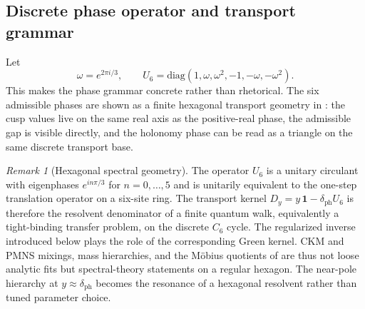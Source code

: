 \documentclass[11pt,a4paper]{article}
\theoremstyle{definition}
\theoremstyle{remark}
\newtheorem*{remark}{Remark}
\begin{document}
\subsection{Discrete phase operator and transport grammar}

Let
\[
\omega=e^{2\pi i/3},
\qquad
U_6=\mathrm{diag}(1,\omega,\omega^2,-1,-\omega,-\omega^2).
\]
This makes the phase grammar concrete rather than rhetorical. The six admissible phases are shown as a finite hexagonal transport geometry in : the cusp values live on the same real axis as the positive-real phase, the admissible gap is visible directly, and the holonomy phase can be read as a triangle on the same discrete transport base.

\begin{remark}[Hexagonal spectral geometry]
The operator $U_6$ is a unitary circulant with eigenphases $e^{in\pi/3}$ for $n=0,\dots,5$ and is unitarily equivalent to the one-step translation operator on a six-site ring. The transport kernel $D_y=y\,\mathbf 1-\delta_{\mathrm{ph}}U_6$ is therefore the resolvent denominator of a finite quantum walk, equivalently a tight-binding transfer problem, on the discrete $C_6$ cycle. The regularized inverse introduced below plays the role of the corresponding Green kernel. CKM and PMNS mixings, mass hierarchies, and the Möbius quotients of  are thus not loose analytic fits but spectral-theory statements on a regular hexagon. The near-pole hierarchy at $y\approx\delta_{\mathrm{ph}}$ becomes the resonance of a hexagonal resolvent rather than tuned parameter choice.
\end{remark}
\end{document}
